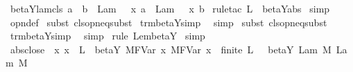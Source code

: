 \begin{isabellebody}
%
\endisadelimproof
\isanewline
{}\isamarkupfalse%
\ beta{\isacharunderscore}Y{\isacharunderscore}lam{\isacharunderscore}cls{\isacharcolon}\ {\isachardoublequoteopen}a\ {\isasymRightarrow}\ b\ {\isasymLongrightarrow}\ Lam\ {\isacharbraceleft}{}\ {\isacharless}{\isacharminus}\ x{\isacharbraceright}\ a\ {\isasymRightarrow}\ Lam\ {\isacharbraceleft}{}\ {\isacharless}{\isacharminus}\ x{\isacharbraceright}\ b{\isachardoublequoteclose}\isanewline
%
\isadelimproof
%
\endisadelimproof
%
\isatagproof
{}\isamarkupfalse%
\ {\isacharparenleft}rule{\isacharunderscore}tac\ L{\isacharequal}{\isachardoublequoteopen}{\isacharbraceleft}{\isacharbraceright}{\isachardoublequoteclose}\ \ beta{\isacharunderscore}Y{\isachardot}abs{\isacharparenright}\isanewline
{}\isamarkupfalse%
\ simp\isanewline
{}\isamarkupfalse%
\ opn{\isacharprime}{\isacharunderscore}def\isanewline
{}\isamarkupfalse%
\isanewline
{}\isamarkupfalse%
\ {\isacharparenleft}subst{\isacharparenleft}{}{\isacharparenright}\ cls{\isacharunderscore}opn{\isacharunderscore}eq{\isacharunderscore}subst{\isacharparenright}\isanewline
{}\isamarkupfalse%
\ trm{\isacharunderscore}beta{\isacharunderscore}Y{\isacharunderscore}simp{}\ \isamarkupfalse%
\ simp\isanewline
{}\isamarkupfalse%
\ {\isacharparenleft}subst\ cls{\isacharunderscore}opn{\isacharunderscore}eq{\isacharunderscore}subst{\isacharparenright}\isanewline
{}\isamarkupfalse%
\ trm{\isacharunderscore}beta{\isacharunderscore}Y{\isacharunderscore}simp{}\ \isamarkupfalse%
\ simp\isanewline
{}\isamarkupfalse%
\ {\isacharparenleft}rule\ Lem{}{\isacharunderscore}{}{\isacharunderscore}{}{\isacharprime}{\isacharunderscore}beta{\isacharunderscore}Y{\isacharparenright}\isanewline
{}\isamarkupfalse%
\ simp%
\endisatagproof
{\isafoldproof}%
%
\isadelimproof
\isanewline
%
\endisadelimproof
\isanewline
{}\isamarkupfalse%
\ abs{\isacharunderscore}close{\isacharcolon}\ {\isachardoublequoteopen}{\isasymlbrakk}\ {\isasymAnd}x{\isachardot}\ x\ {\isasymnotin}\ L\ {\isasymLongrightarrow}\ beta{\isacharunderscore}Y{\isacharasterisk}\ {\isacharparenleft}M{\isacharcircum}FVar\ x{\isacharparenright}\ {\isacharparenleft}M{\isacharprime}{\isacharcircum}FVar\ x{\isacharparenright}\ {\isacharsemicolon}\ finite\ L\ {\isasymrbrakk}\ {\isasymLongrightarrow}\ beta{\isacharunderscore}Y{\isacharasterisk}\ {\isacharparenleft}Lam\ M{\isacharparenright}\ {\isacharparenleft}Lam\ M{\isacharprime}{\isacharparenright}{\isachardoublequoteclose}\isanewline

\end{isabellebody}
